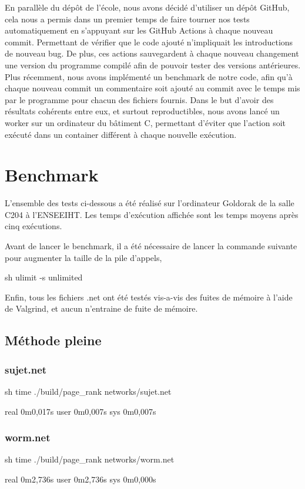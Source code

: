 \documentclass{NewTeX}
\begin{document}
En parallèle du dépôt de l'école, nous avons décidé d'utiliser un dépôt GitHub, cela nous a permis dans un premier temps de faire tourner nos tests automatiquement en s'appuyant sur les GitHub Actions à chaque nouveau commit. Permettant de vérifier que le code ajouté n'impliquait les introductions de nouveau bug. De plus, ces actions sauvegardent à chaque nouveau changement une version du programme compilé afin de pouvoir tester des versions antérieures. Plus récemment, nous avons implémenté un benchmark de notre code, afin qu'à chaque nouveau commit un commentaire soit ajouté au commit avec le temps mis par le programme pour chacun des fichiers fournis.  Dans le but d'avoir des résultats cohérents entre eux, et surtout reproductibles, nous avons lancé un worker sur un ordinateur du bâtiment C, permettant d'éviter que l'action soit exécuté dans un container différent à chaque nouvelle exécution.

\section{Benchmark}
L'ensemble des tests ci-dessous a été réalisé sur l'ordinateur Goldorak de la salle C204 à l'ENSEEIHT. Les temps d'exécution affichée sont les temps moyens après cinq exécutions.

Avant de lancer le benchmark, il a été nécessaire de lancer la commande suivante pour augmenter la taille de la pile d'appels, 
\begin{code}{sh}
ulimit -s unlimited
\end{code}

Enfin, tous les fichiers .net ont été testés vis-a-vis des fuites de mémoire à l'aide de Valgrind, et aucun n'entraine de fuite de mémoire.

\subsection{Méthode pleine}
\subsubsection{sujet.net}
\begin{code}{sh}
time ./build/page_rank networks/sujet.net

real    0m0,017s
user    0m0,007s
sys     0m0,007s
\end{code}
\subsubsection{worm.net}
\begin{code}{sh}
time ./build/page_rank networks/worm.net

real    0m2,736s
user    0m2,736s
sys     0m0,000s
\end{code}
\end{document}
